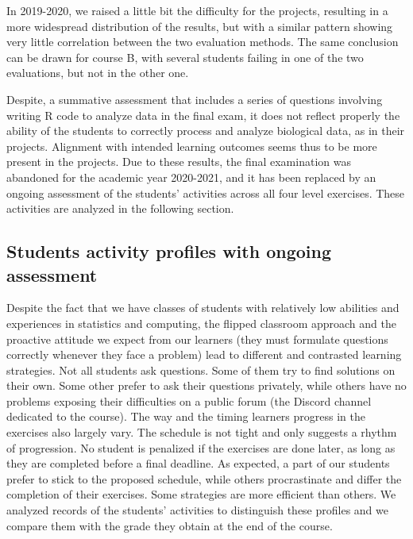 \documentclass{aims}
\theoremstyle{definition}
\begin{document}
In 2019-2020, we raised a little bit the difficulty for the projects,
resulting in a more widespread distribution of the results, but with a
similar pattern showing very little correlation between the two
evaluation methods. The same conclusion can be drawn for course B, with
several students failing in one of the two evaluations, but not in the
other one.

Despite, a summative assessment that includes a series of questions
involving writing R code to analyze data in the final exam, it does not
reflect properly the ability of the students to correctly process and
analyze biological data, as in their projects. Alignment with intended
learning outcomes seems thus to be more present in the projects. Due to
these results, the final examination was abandoned for the academic year
2020-2021, and it has been replaced by an ongoing assessment of the
students' activities across all four level exercises. These activities
are analyzed in the following section.

\hypertarget{students-activity-profiles-with-ongoing-assessment}{%
\subsection{Students activity profiles with ongoing
assessment}\label{students-activity-profiles-with-ongoing-assessment}}

Despite the fact that we have classes of students with relatively low
abilities and experiences in statistics and computing, the flipped
classroom approach and the proactive attitude we expect from our
learners (they must formulate questions correctly whenever they face a
problem) lead to different and contrasted learning strategies. Not all
students ask questions. Some of them try to find solutions on their own.
Some other prefer to ask their questions privately, while others have no
problems exposing their difficulties on a public forum (the Discord
channel dedicated to the course). The way and the timing learners
progress in the exercises also largely vary. The schedule is not tight
and only suggests a rhythm of progression. No student is penalized if
the exercises are done later, as long as they are completed before a
final deadline. As expected, a part of our students prefer to stick to
the proposed schedule, while others procrastinate and differ the
completion of their exercises. Some strategies are more efficient than
others. We analyzed records of the students' activities to distinguish
these profiles and we compare them with the grade they obtain at the end
of the course.
\end{document}
